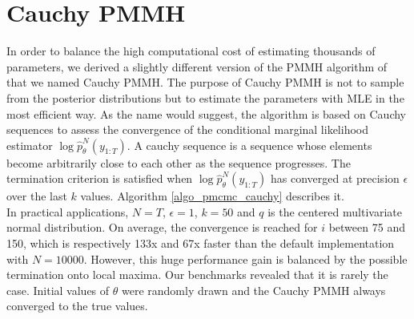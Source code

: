 \documentclass[11pt,a4,twosided,singlespacing,titlepagenumber=on]{scrreprt}
\numberwithin{equation}{chapter} %
\theoremstyle{remark}
\begin{document}
\section{Cauchy PMMH}
\label{app:cauchy_pmmh}
In order to balance the high computational cost of estimating thousands of parameters, we derived a slightly different version of the PMMH algorithm of \cite{andrieu2010} that we named Cauchy PMMH. The purpose of Cauchy PMMH is not to sample from the posterior distributions but to estimate the parameters with MLE in the most efficient way. As the name would suggest, the algorithm is based on Cauchy sequences to assess the convergence of the conditional marginal likelihood estimator $\log \hat{p}^N_{\theta}(y_{1:T})$. A cauchy sequence is a sequence whose elements become arbitrarily close to each other as the sequence progresses. The termination criterion is satisfied when $\log \hat{p}^N_{\theta}(y_{1:T})$ has converged at precision $\epsilon$ over the last $k$ values. Algorithm \ref{algo_pmcmc_cauchy} describes it. \\

In practical applications, $N = T$, $\epsilon = 1$, $k = 50$ and $q$ is the centered multivariate normal distribution. On average, the convergence is reached for $i$ between 75 and 150, which is respectively 133x and 67x faster than the default implementation with $N = 10000$. However, this huge performance gain is balanced by the possible termination onto local maxima. Our benchmarks revealed that it is rarely the case. Initial values of $\theta$ were randomly drawn and the Cauchy PMMH always converged to the true values.
\end{document}
